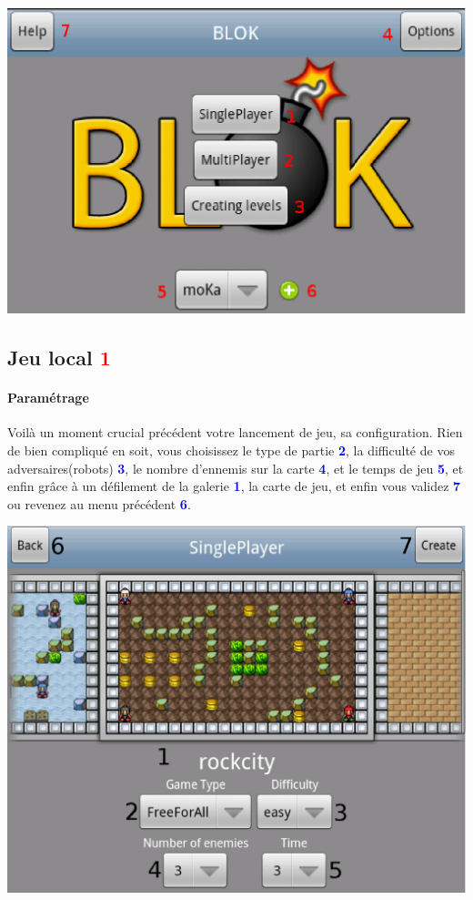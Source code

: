 	\begin{center}
			\includegraphics[scale=0.7]{Manuel/Img/3.eps}
	\end{center}
	
	
	
	\subsection{Jeu local \textcolor{red}{1}}
	\paragraph{Paramétrage\\}
	Voilà un moment crucial précédent votre lancement de jeu, sa configuration.
	Rien de bien compliqué en soit, vous choisissez le type de partie
	\textcolor{blue}{\textbf{2}}, la difficulté de vos adversaires(robots)
	\textcolor{blue}{\textbf{3}}, le nombre d'ennemis sur la carte
	\textcolor{blue}{\textbf{4}}, et le temps de jeu \textcolor{blue}{\textbf{5}},
	et enfin grâce à un défilement de la galerie \textcolor{blue}{\textbf{1}}, la
	carte de jeu, et enfin vous validez \textcolor{blue}{\textbf{7}} ou revenez au
	menu précédent \textcolor{blue}{\textbf{6}}.
	
	\begin{center}
		\includegraphics[scale=0.4]{Manuel/Img/15.eps}
	\end{center}
	
